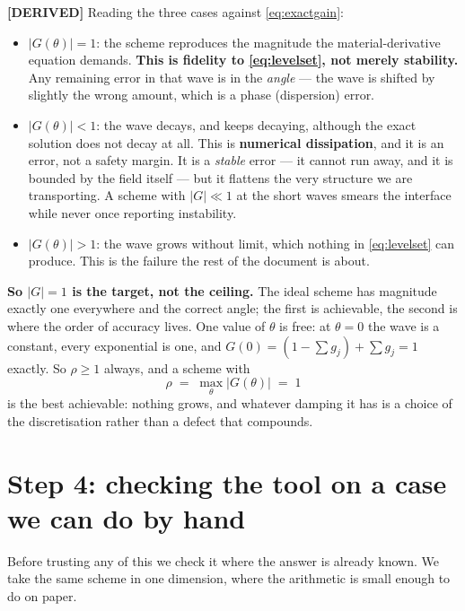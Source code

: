 \documentclass[11pt,a4paper]{article}
\newcommand{\derived}{\textcolor{blue!50!black}{\textbf{[DERIVED]}}}
\begin{document}
\derived{} Reading the three cases against \eqref{eq:exactgain}:

\begin{itemize}
\item \(|G(\theta)| = 1\): the scheme reproduces the magnitude the material-derivative equation
      demands. \textbf{This is fidelity to \eqref{eq:levelset}, not merely stability.} Any
      remaining error in that wave is in the \emph{angle} --- the wave is shifted by slightly
      the wrong amount, which is a phase (dispersion) error.
\item \(|G(\theta)| < 1\): the wave decays, and keeps decaying, although the exact solution does
      not decay at all. This is \textbf{numerical dissipation}, and it is an error, not a
      safety margin. It is a \emph{stable} error --- it cannot run away, and it is bounded by
      the field itself --- but it flattens the very structure we are transporting. A scheme with
      \(|G| \ll 1\) at the short waves smears the interface while never once reporting
      instability.
\item \(|G(\theta)| > 1\): the wave grows without limit, which nothing in \eqref{eq:levelset}
      can produce. This is the failure the rest of the document is about.
\end{itemize}

\textbf{So \(|G| = 1\) is the target, not the ceiling.} The ideal scheme has magnitude exactly
one everywhere and the correct angle; the first is achievable, the second is where the order of
accuracy lives. One value of \(\theta\) is free: at \(\theta = 0\) the wave is a constant,
every exponential is one, and \(G(0) = (1 - \sum g_j) + \sum g_j = 1\) exactly. So
\(\rho \ge 1\) always, and a scheme with
\begin{equation}
  \rho \;=\; \max_\theta |G(\theta)| \;=\; 1
\end{equation}
is the best achievable: nothing grows, and whatever damping it has is a choice of the
discretisation rather than a defect that compounds.

\section{Step 4: checking the tool on a case we can do by hand}
\label{sec:validate}

Before trusting any of this we check it where the answer is already known. We take the same
scheme in one dimension, where the arithmetic is small enough to do on paper.
\end{document}
